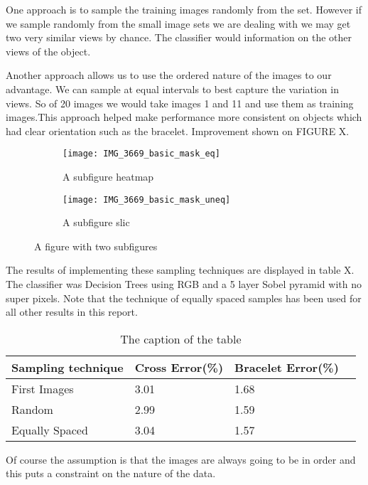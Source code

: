 \documentclass[12pt]{IIBproject}
\begin{document}
One approach is to sample the training images randomly from the set. However if we sample randomly from the small image sets we are dealing with we may get two very similar views by chance. The classifier would information on the other views of the object. 

Another approach allows us to use the ordered nature of the images to our advantage. We can sample at equal intervals to best capture the variation in views. So of 20 images we would take images 1 and 11 and use them as training images.This approach helped make performance more consistent on objects which had clear orientation such as the bracelet. Improvement shown on FIGURE X.
\begin{figure}[H]
\centering
\begin{subfigure}{.45\textwidth}
  \centering
  \texttt{[image: IMG\_3669\_basic\_mask\_eq]}
  \caption{A subfigure heatmap}
  \label{fig:sub2}
\end{subfigure}
\begin{subfigure}{.45\textwidth}
  \centering
  \texttt{[image: IMG\_3669\_basic\_mask\_uneq]}
  \caption{A subfigure slic}
  \label{fig:sub1}
\end{subfigure}%


\caption{A figure with two subfigures}
\label{fig:test}
\end{figure}

The results of implementing these sampling techniques are displayed in table X. The classifier was Decision Trees using RGB and a 5 layer Sobel pyramid with no super pixels. Note that the technique of equally spaced samples has been used for all other results in this report.
\begin{table}
\begin{center}
    \begin{tabular}{ | l | l | l | p{5cm} |}
    \hline
    Sampling technique & Cross Error(\%) & Bracelet Error(\%) \\ \hline
    First Images & 3.01 & 1.68 \\ \hline
    Random & 2.99 & 1.59 \\
    \hline
    Equally Spaced & 3.04 & 1.57 \\
    \hline
    \end{tabular}
    \caption{The caption of the table}\label{table:somename}
\end{center}
\end{table}
 Of course the assumption is that the images are always going to be in order and this puts a constraint on the nature of the data.
\end{document}
